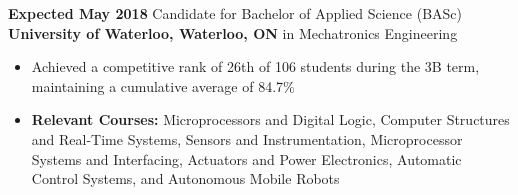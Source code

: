 \documentclass[hidelinks]{kkurucz-cv}
\begin{document}
\begin{entrylist}
\entry
{\textbf{Expected May 2018}}
{Candidate for Bachelor of Applied Science (BASc)}
{\textbf{University of Waterloo, Waterloo, ON}}
{{\headingfont in Mechatronics Engineering}}
{
\begin{itemize}
\item Achieved a competitive rank of 26th of 106 students during the 3B term, maintaining a cumulative average of 84.7\%
\item \textbf{Relevant Courses:}  Microprocessors and Digital Logic, Computer Structures and Real-Time Systems, Sensors and Instrumentation, Microprocessor Systems and Interfacing, Actuators and Power Electronics, Automatic Control Systems, and Autonomous Mobile Robots
\end{itemize}
}
\end{entrylist}
\end{document}
